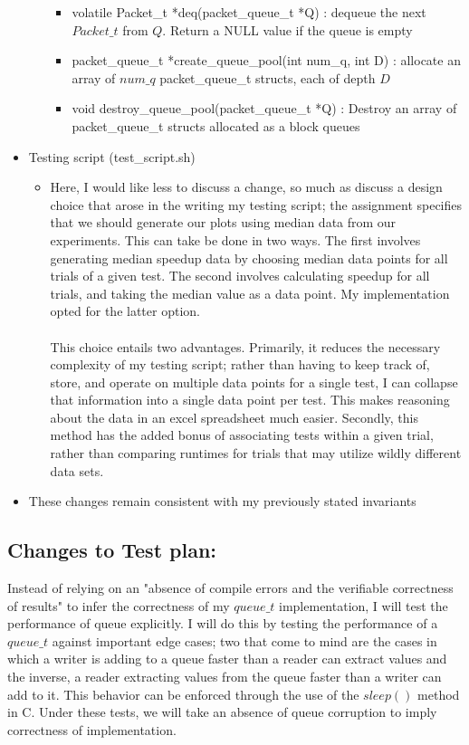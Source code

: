 \documentclass[]{article}
\begin{document}
\begin{itemize}
\begin{itemize}
\begin{itemize}
			\item volatile Packet\_t *deq(packet\_queue\_t *Q) : dequeue the next $Packet\_t$ from $Q$. Return a NULL value if the queue is empty
			\item packet\_queue\_t *create\_queue\_pool(int num\_q, int D) : allocate an array of $num\_q$ packet\_queue\_t structs, each of depth $D$
			\item void destroy\_queue\_pool(packet\_queue\_t *Q) : Destroy an array of packet\_queue\_t structs allocated as a block queues
		\end{itemize}
	\end{itemize}
	\item Testing script (test\_script.sh)
	\begin{itemize}
		\item Here, I would like less to discuss a change, so much as discuss a design choice that arose in the writing my testing script; the assignment specifies that we should generate our plots using median data from our experiments. This can take be done in two ways. The first involves generating median speedup data by choosing median data points for all trials of a given test. The second involves calculating speedup for all trials, and taking the median value as a data point. My implementation opted for the latter option.
		\\\\
		This choice entails two advantages. Primarily, it reduces the necessary complexity of my testing script; rather than having to keep track of, store, and operate on multiple data points for a single test, I can collapse that information into a single data point per test. This makes reasoning about the data in an excel spreadsheet much easier. Secondly, this method has the added bonus of associating tests within a given trial, rather than comparing runtimes for trials that may utilize wildly different data sets.
	\end{itemize}
	\item These changes remain consistent with my previously stated invariants
\end{itemize}

\subsection{Changes to Test plan:}
Instead of relying on an "absence of compile errors and the verifiable correctness of results" to infer the correctness of my $queue\_t$ implementation, I will test the performance of queue explicitly. I will do this by testing the performance of a $queue\_t$ against important edge cases; two that come to mind are the cases in which a writer is adding to a queue faster than a reader can extract values and the inverse, a reader extracting values from the queue faster than a writer can add to it. This behavior can be enforced through the use of the $sleep()$ method in C. Under these tests, we will take an absence of queue corruption to imply correctness of implementation.
\end{document}
